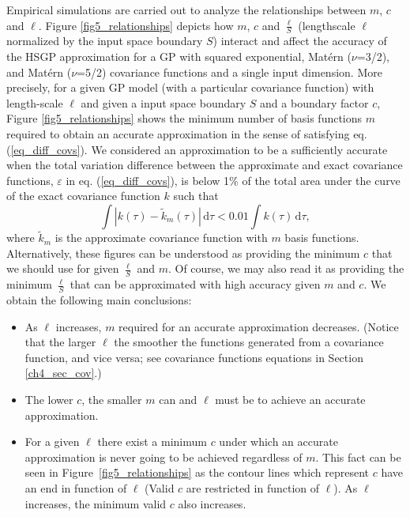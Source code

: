 Empirical simulations are carried out to analyze the relationships between $m$, $c$ and $\ell$. Figure \ref{fig5_relationships} depicts how $m$, $c$ and $\frac{\ell}{S}$ (lengthscale $\ell$ normalized {\color{blue}by the input space boundary $S$}) interact and affect the accuracy of the HSGP approximation for a GP with squared exponential, Mat\'ern ($\nu$=3/2), and Mat\'ern ($\nu$=5/2) covariance functions and a single input dimension. More precisely, for a given GP model (with a particular covariance function) {\color{blue}with length-scale $\ell$ 
 and given a input space boundary $S$ and a boundary factor $c$}, Figure \ref{fig5_relationships} shows the minimum number of basis functions $m$ required to obtain an accurate approximation in the sense of satisfying eq. (\ref{eq_diff_covs}). We considered an approximation to be a sufficiently accurate when the total variation difference between the approximate and exact covariance functions, $\varepsilon$ in eq. (\ref{eq_diff_covs}), is below 1$\%$ of the total area under the curve of the exact covariance function $k$ such that
%
\begin{equation} \label{eq:rel_total_distance}
 \int | k(\tau) - \tilde{k}_m(\tau)|  \,\mathrm{d}\tau  < 0.01 \int k(\tau) \,\mathrm{d}\tau,
\end{equation}
%
where $\tilde{k}_m$ is the approximate covariance function with $m$ basis functions. Alternatively, these figures can be understood as providing the minimum $c$ that we should use for given $\frac{\ell}{S}$ and $m$. Of course, we may also read it as providing the minimum $\frac{\ell}{S}$ that can be approximated with high accuracy given $m$ and $c$. We obtain the following main conclusions:
%
\begin{itemize}
\item As $\ell$ increases, $m$ required for an accurate approximation decreases. (Notice that the larger $\ell$ the smoother the functions generated from a covariance function, and vice versa; see covariance functions equations in Section \ref{ch4_sec_cov}.)
\item The lower $c$, the smaller $m$ can and $\ell$ must be to achieve an accurate approximation.
\item For a given $\ell$ there exist a minimum $c$ under which an accurate approximation is never going to be achieved regardless of $m$. This fact can be seen in Figure~\ref{fig5_relationships} as the contour lines which represent $c$ have an end in function of $\ell$ (Valid $c$ are restricted in function of $\ell$). As $\ell$ increases, the minimum valid $c$ also increases.
\end{itemize}

